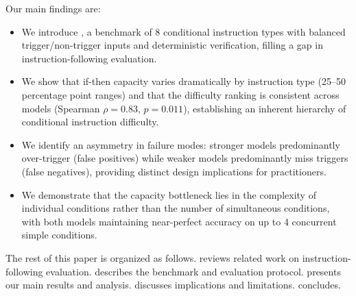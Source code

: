 Our main findings are:
\begin{itemize}[leftmargin=*,itemsep=0pt,topsep=0pt]
    \item We introduce \benchname, a benchmark of 8 conditional instruction types with balanced trigger/non-trigger inputs and deterministic verification, filling a gap in instruction-following evaluation.
    \item We show that if-then capacity varies dramatically by instruction type (25--50 percentage point ranges) and that the difficulty ranking is consistent across models (Spearman $\rho = 0.83$, $p = 0.011$), establishing an inherent hierarchy of conditional instruction difficulty.
    \item We identify an asymmetry in failure modes: stronger models predominantly over-trigger (false positives) while weaker models predominantly miss triggers (false negatives), providing distinct design implications for practitioners.
    \item We demonstrate that the capacity bottleneck lies in the complexity of individual conditions rather than the number of simultaneous conditions, with both models maintaining near-perfect accuracy on up to 4 concurrent simple conditions.
\end{itemize}

The rest of this paper is organized as follows.  reviews related work on instruction-following evaluation.  describes the \benchname benchmark and evaluation protocol.  presents our main results and analysis.  discusses implications and limitations.  concludes.
